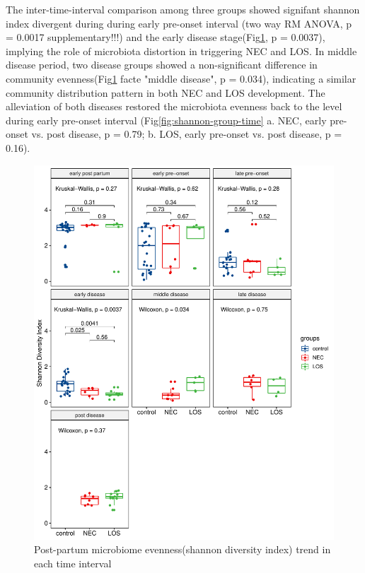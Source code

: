 \documentclass[fleqn,10pt,lineno]{wlpeerj} %
\begin{document}
    \noindent
    The inter-time-interval comparison among three groups showed signifant shannon index divergent during during early pre-onset interval (two way RM ANOVA, p = 0.0017 supplementary!!!) and the early disease stage(Fig\ref{fig:shannon-time-groups}, p = 0.0037), implying the role of microbiota distortion in triggering NEC and LOS. In middle disease period, two disease groups showed a non-significant difference in community evenness(Fig\ref{fig:shannon-time-groups} facte "middle disease", p = 0.034), indicating a similar community distribution pattern in both NEC and LOS development. The alleviation of both diseases restored the microbiota evenness back to the level during early pre-onset interval (Fig\ref{fig:shannon-group-time} a. NEC, early pre-onset vs. post disease, p = 0.79; b. LOS, early pre-onset vs. post disease, p = 0.16).
    \begin{figure}[ht]\centering
      \includegraphics[width=\linewidth]{figure/shannon-time-groups.pdf}
      \caption{Post-partum microbiome evenness(shannon diversity index) trend in each time interval}
      \label{fig:shannon-time-groups}
    \end{figure}
\end{document}
